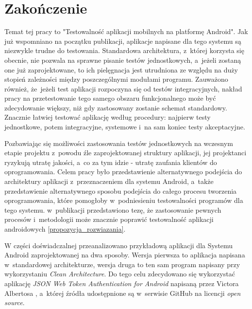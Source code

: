 \chapter{Zakończenie}
\label{zakonczenie}

Temat tej pracy to "Testowalność aplikacji mobilnych na platformę Android". Jak już wspomniano na początku publikacji, aplikacje napisane dla tego systemu są niezwykle trudne do testowania. Standardowa architektura, z~której korzysta się obecnie, nie pozwala na sprawne pisanie testów jednostkowych, a~jeżeli zostaną one już zaprojektowane, to ich pielęgnacja jest utrudniona ze względu na duży stopień zależności między poszczególnymi modułami programu. Zauważono również, że~jeżeli test aplikacji rozpoczyna się od testów integracyjnych, nakład pracy na przetestowanie tego samego obszaru funkcjonalnego może być zdecydowanie większy, niż gdy zastosowany zostanie schemat standardowy. Znacznie łatwiej testować aplikację według procedury: najpierw testy jednostkowe, potem integracyjne, systemowe i~na sam koniec testy akceptacyjne. 

Pozbawiając się możliwości zastosowania testów jednostkowych na wczesnym etapie projektu z~powodu źle zaprojektowanej struktury aplikacji, jej projektanci ryzykują utratę jakości, a~co za tym idzie - utratę zaufania klientów do oprogramowania. Celem pracy było przedstawienie alternatywnego podejścia do architektury aplikacji z~przeznaczeniem dla systemu Android, a~także przedstawienie alternatywnego sposobu podejścia do całego procesu tworzenia oprogramowania, które pomogłoby w~podniesieniu testowalności programów dla tego systemu. w~publikacji przedstawiono tezę, że zastosowanie pewnych procesów i~metodologii może znacznie poprawić testowalność aplikacji androidowych \ref{propozycja_rozwiazania}.

W części doświadczalnej przeanalizowano przykładową aplikacji dla Systemu Android zaprojektowanej na dwa sposoby. Wersja pierwsza to aplikacja napisana w~standardowej architekturze, wersja druga to ten sam program napisany przy wykorzystaniu \textit{Clean Architecture}. Do tego celu zdecydowano się wykorzystać
aplikację \textit{JSON Web Token Authentication for Android} napisaną przez Victora Albertosa \cite{website:victor:aplication} , a~której źródła udostępnione są w~serwisie GitHub na licencji \textit{open source}.

